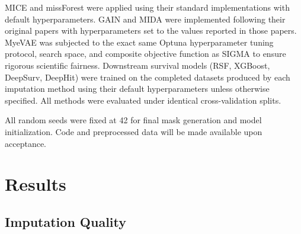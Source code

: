\documentclass[final,3p,times,authoryear]{elsarticle}
\begin{document}
MICE and missForest were applied using their standard implementations with default hyperparameters. GAIN and MIDA were implemented following their original papers \citep{yoon2018gain, gondara2018mida} with hyperparameters set to the values reported in those papers. MyeVAE was subjected to the exact same Optuna hyperparameter tuning protocol, search space, and composite objective function as SIGMA to ensure rigorous scientific fairness. Downstream survival models (RSF, XGBoost, DeepSurv, DeepHit) were trained on the completed datasets produced by each imputation method using their default hyperparameters unless otherwise specified. All methods were evaluated under identical cross-validation splits.

All random seeds were fixed at 42 for final mask generation and model initialization. Code and preprocessed data will be made available upon acceptance.



\section{Results}
\label{sec:results}

\subsection{Imputation Quality}
\end{document}
